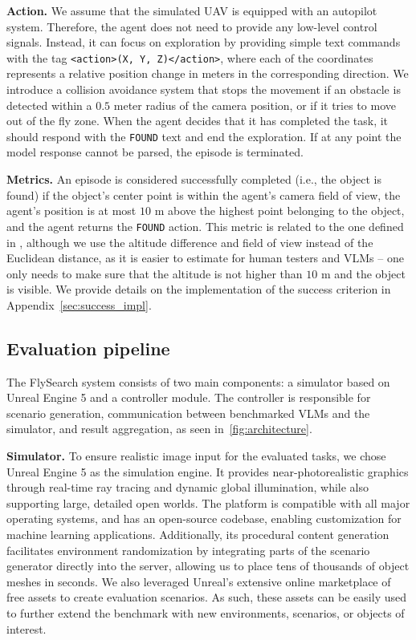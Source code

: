 \documentclass{article}
\theoremstyle{plain}
\theoremstyle{definition}
\theoremstyle{remark}
\newcommand{\ours}{FlySearch}
\begin{document}
\textbf{Action.}
We assume that the simulated UAV is equipped with an autopilot system. Therefore, the agent does not need to provide any low-level control signals. Instead, it can focus on exploration by providing simple text commands with the tag \texttt{<action>(X, Y, Z)</action>}, where each of the coordinates represents a relative position change in meters in the corresponding direction. We introduce a collision avoidance system that stops the movement if an obstacle is detected within a $0.5$ meter radius of the camera position, or if it tries to move out of the fly zone. When the agent decides that it has completed the task, it should respond with the \texttt{FOUND} text and end the exploration. If at any point the model response cannot be parsed, the episode is terminated.

\textbf{Metrics.}
\label{sec:metrics}
An episode is considered successfully completed (i.e., the object is found) if the object's center point is within the agent's camera field of view, the agent's position is at most $10$ m above the highest point belonging to the object, and the agent returns the \texttt{FOUND} action.
This metric is related to the one defined in \citep{batra2020objectnav}, although we use the altitude difference and field of view instead of the Euclidean distance, as it is easier to estimate for human testers and VLMs -- one only needs to make sure that the altitude is not higher than $10$ m and the object is visible. We provide details on the implementation of the success criterion in Appendix~\ref{sec:success_impl}.

\subsection{Evaluation pipeline}


The \ours{} system consists of two main components: a simulator based on Unreal Engine 5 and a controller module. The controller is responsible for scenario generation, communication between benchmarked VLMs and the simulator, and result aggregation, as seen in~\cref{fig:architecture}. 


\textbf{Simulator.}
To ensure realistic image input for the evaluated tasks, we chose Unreal Engine 5 as the simulation engine. It provides near-photorealistic graphics through real-time ray tracing and dynamic global illumination, while also supporting large, detailed open worlds. The platform is compatible with all major operating systems, and has an open-source codebase, enabling customization for machine learning applications. Additionally, its procedural content generation facilitates environment randomization by integrating parts of the scenario generator directly into the server, allowing us to place tens of thousands of object meshes in seconds. We also leveraged Unreal's extensive online marketplace of free assets to create evaluation scenarios. As such, these assets can be easily used to further extend the benchmark with new environments, scenarios, or objects of interest.
\end{document}
